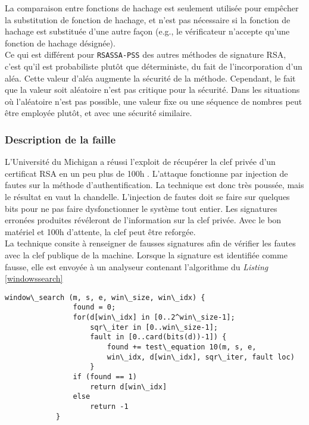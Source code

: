 La comparaison entre fonctions de hachage est seulement utilisée pour empêcher la substitution de fonction de hachage, et n'est pas nécessaire si la fonction de hachage est substituée d'une autre façon (e.g., le vérificateur n'accepte qu'une fonction de hachage désignée).\\ 


Ce qui est différent pour \texttt{RSASSA-PSS} des autres méthodes de signature RSA, c'est qu'il est probabiliste plutôt que déterministe, du fait de  l'incorporation d'un aléa. Cette valeur d'aléa augmente la sécurité de la méthode. Cependant, le fait que la valeur soit aléatoire n'est pas critique pour la sécurité. Dans les situations où l'aléatoire n'est pas possible, une valeur fixe ou une séquence de nombres peut être employée plutôt, et avec une sécurité similaire.

		\subsubsection{Description de la faille}
		
			L'Université du Michigan a réussi l'exploit de récupérer la clef privée d'un certificat RSA en un peu plus de 100h \cite{andrea2010RSA} \cite{opensslvuln2010}. L'attaque fonctionne par injection de fautes \cite{fault2008lawson} sur la méthode d'authentification. La technique est donc très poussée, mais le résultat en vaut la chandelle. L'injection de fautes doit se faire sur quelques bits pour ne pas faire dysfonctionner le système tout entier. Les signatures erronées produites révéleront de l'information sur la clef privée. Avec le bon matériel et 100h d'attente, la clef peut être reforgée.\\

			La technique consite à renseigner de fausses signatures afin de vérifier les fautes avec la clef publique de la machine. Lorsque la signature est identifiée comme fausse, elle est envoyée à un analyseur contenant l'algorithme du \textit{Listing} \ref{windowssearch}

			\begin{lstlisting}[style=customc,caption=window\_search.c, label=windowssearch]
			window\_search (m, s, e, win\_size, win\_idx) {
				found = 0;
				for(d[win\_idx] in [0..2^win\_size-1];
					sqr\_iter in [0..win\_size-1];
					fault in [0..card(bits(d))-1]) {
						found += test\_equation 10(m, s, e,
						win\_idx, d[win\_idx], sqr\_iter, fault loc)
					}
				if (found == 1) 
					return d[win\_idx]
				else 
					return -1
			}
			\end{lstlisting}

